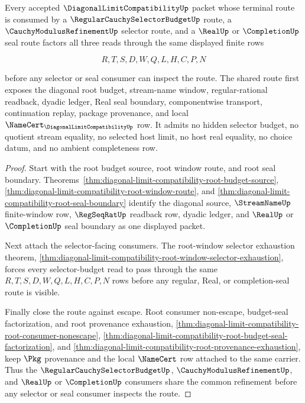 \begin{theorem}
\label{thm:diagonal-limit-compatibility-selector-budget-common-refinement}
Every accepted $\DiagonalLimitCompatibilityUp$ packet whose terminal route is consumed by a $\RegularCauchySelectorBudgetUp$ route, a $\CauchyModulusRefinementUp$ selector route, and a $\RealUp$ or $\CompletionUp$ seal route factors all three reads through the same displayed finite rows

$$
R,T,S,D,W,Q,L,H,C,P,N
$$

before any selector or seal consumer can inspect the route. The shared route first exposes the diagonal root budget, stream-name window, regular-rational readback, dyadic ledger, Real seal boundary, componentwise transport, continuation replay, package provenance, and local $\NameCert_{\DiagonalLimitCompatibilityUp}$ row. It admits no hidden selector budget, no quotient stream equality, no selected host limit, no host real equality, no choice datum, and no ambient completeness row.
\end{theorem}
\begin{proof}
Start with the root budget source, root window route, and root seal boundary. Theorems~\ref{thm:diagonal-limit-compatibility-root-budget-source}, \ref{thm:diagonal-limit-compatibility-root-window-route}, and \ref{thm:diagonal-limit-compatibility-root-seal-boundary} identify the diagonal source, $\StreamNameUp$ finite-window row, $\RegSeqRatUp$ readback row, dyadic ledger, and $\RealUp$ or $\CompletionUp$ seal boundary as one displayed packet.

Next attach the selector-facing consumers. The root-window selector exhaustion theorem, \autoref{thm:diagonal-limit-compatibility-root-window-selector-exhaustion}, forces every selector-budget read to pass through the same $R,T,S,D,W,Q,L,H,C,P,N$ rows before any regular, Real, or completion-seal route is visible.

Finally close the route against escape. Root consumer non-escape, budget-seal factorization, and root provenance exhaustion, \autoref{thm:diagonal-limit-compatibility-root-consumer-nonescape}, \autoref{thm:diagonal-limit-compatibility-root-budget-seal-factorization}, and \autoref{thm:diagonal-limit-compatibility-root-provenance-exhaustion}, keep $\Pkg$ provenance and the local $\NameCert$ row attached to the same carrier. Thus the $\RegularCauchySelectorBudgetUp$, $\CauchyModulusRefinementUp$, and $\RealUp$ or $\CompletionUp$ consumers share the common refinement before any selector or seal consumer inspects the route.
\end{proof}

